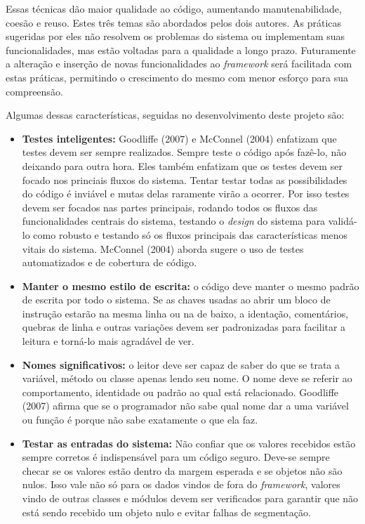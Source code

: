Essas técnicas dão maior qualidade ao código, aumentando manutenabilidade, coesão e reuso. Estes três temas são abordados pelos dois autores. As práticas sugeridas por eles não resolvem os problemas do sistema ou implementam suas funcionalidades, mas estão voltadas para a qualidade a longo prazo. Futuramente a alteração e inserção de novas funcionalidades ao \textit{framework} será facilitada com estas práticas, permitindo o crescimento do mesmo com menor esforço para sua compreensão.

Algumas dessas características, seguidas no desenvolvimento deste projeto são:

\begin{itemize}
  \item \textbf{Testes inteligentes:} Goodliffe (2007) e McConnel (2004) enfatizam que testes devem ser sempre realizados. Sempre teste o código após fazê-lo, não deixando para outra hora. Eles também enfatizam que os testes devem ser focado nos princiais fluxos do sistema. Tentar testar todas as possibilidades do código é inviável e mutas delas raramente virão a ocorrer. Por isso testes devem ser focados nas partes principais, rodando todos os fluxos das funcionalidades centrais do sistema, testando o \textit{design} do sistema para validá-lo como robusto e testando só os fluxos principais das características menos vitais do sistema. McConnel (2004) aborda sugere o uso de testes automatizados e de cobertura de código.
  \item \textbf{Manter o mesmo estilo de escrita:} o código deve manter o mesmo padrão de escrita por todo o sistema. Se as chaves usadas ao abrir um bloco de instrução estarão na mesma linha ou na de baixo, a identação, comentários, quebras de linha e outras variações devem ser padronizadas para facilitar a leitura e torná-lo mais agradável de ver.
  \item \textbf{Nomes significativos:} o leitor deve ser capaz de saber do que se trata a variável, método ou classe apenas lendo seu nome. O nome deve se referir ao comportamento, identidade ou padrão ao qual está relacionado. Goodliffe (2007) afirma que se o programador não sabe qual nome dar a uma variável ou função é porque não sabe exatamente o que ela faz.
  \item \textbf{Testar as entradas do sistema:} Não confiar que os valores recebidos estão sempre corretos é indispensável para um código seguro. Deve-se sempre checar se os valores estão dentro da margem esperada e se objetos não são nulos. Isso vale não só para os dados vindos de fora do \textit{framework}, valores vindo de outras classes e módulos devem ser verificados para garantir que não está sendo recebido um objeto nulo e evitar falhas de segmentação.

\end{itemize}
